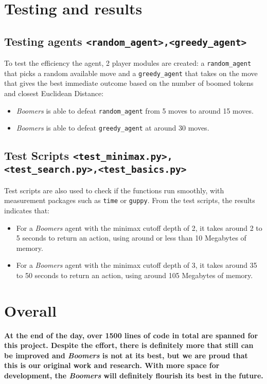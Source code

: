 \documentclass[]{article}
\begin{document}
\newpage
\section{Testing and results}

\subsection{Testing agents \texttt{<random\_agent>,<greedy\_agent>}}
To test the efficiency the agent, 2 player modules are created: a \texttt{random\_agent} that picks a random available move and a \texttt{greedy\_agent} that takes on the move that gives the best immediate outcome based on the number of boomed tokens and closest Euclidean Distance:
\begin{itemize}
    \item \emph{Boomers} is able to defeat \texttt{random\_agent} from 5 moves to around 15 moves.
    \item \emph{Boomers} is able to defeat \texttt{greedy\_agent} at around 30 moves.
\end{itemize}

\subsection{Test Scripts \texttt{<test\_minimax.py>,<test\_search.py>,<test\_basics.py>}}
Test scripts are also used to check if the functions run smoothly, with measurement packages such as \texttt{time} or \texttt{guppy}. From the test scripts, the results indicates that:

\begin{itemize}
    \item For a \emph{Boomers} agent with the minimax cutoff depth of 2, it takes around 2 to 5 seconds to return an action, using around or less than 10 Megabytes of memory.
    \item For a \emph{Boomers} agent with the minimax cutoff depth of 3, it takes around 35 to 50 seconds to return an action, using around 105 Megabytes of memory.
\end{itemize}

\section*{Overall}
\textbf{At the end of the day, over 1500 lines of code in total are spanned for this project. Despite the effort, there is definitely more that still can be improved and \emph{Boomers} is not at its best, but we are proud that this is our original work and research. With more space for development, the \emph{Boomers} will definitely flourish its best in the future.}
\end{document}
